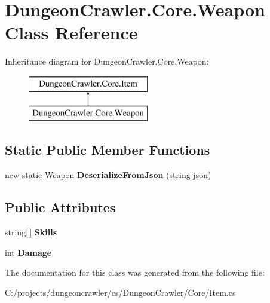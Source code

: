\hypertarget{class_dungeon_crawler_1_1_core_1_1_weapon}{}\section{Dungeon\+Crawler.\+Core.\+Weapon Class Reference}
\label{class_dungeon_crawler_1_1_core_1_1_weapon}
Inheritance diagram for Dungeon\+Crawler.\+Core.\+Weapon\+:\begin{figure}[H]
\begin{center}
\leavevmode
\includegraphics[height=2.000000cm]{class_dungeon_crawler_1_1_core_1_1_weapon}
\end{center}
\end{figure}
\subsection*{Static Public Member Functions}
\begin{DoxyCompactItemize}
\item 
\hypertarget{class_dungeon_crawler_1_1_core_1_1_weapon_a6d99de4da4b070ee5e5dbeef5e5f7481}{}new static \hyperlink{class_dungeon_crawler_1_1_core_1_1_weapon}{Weapon} {\bfseries Deserialize\+From\+Json} (string json)\label{class_dungeon_crawler_1_1_core_1_1_weapon_a6d99de4da4b070ee5e5dbeef5e5f7481}

\end{DoxyCompactItemize}
\subsection*{Public Attributes}
\begin{DoxyCompactItemize}
\item 
\hypertarget{class_dungeon_crawler_1_1_core_1_1_weapon_a320a9cc5a44478e81ce852b88557f03d}{}string\mbox{[}$\,$\mbox{]} {\bfseries Skills}\label{class_dungeon_crawler_1_1_core_1_1_weapon_a320a9cc5a44478e81ce852b88557f03d}

\item 
\hypertarget{class_dungeon_crawler_1_1_core_1_1_weapon_a2638db696abeed45dc2327e7c0e1e7ea}{}int {\bfseries Damage}\label{class_dungeon_crawler_1_1_core_1_1_weapon_a2638db696abeed45dc2327e7c0e1e7ea}

\end{DoxyCompactItemize}


The documentation for this class was generated from the following file\+:\begin{DoxyCompactItemize}
\item 
C\+:/projects/dungeoncrawler/cs/\+Dungeon\+Crawler/\+Core/Item.\+cs\end{DoxyCompactItemize}
